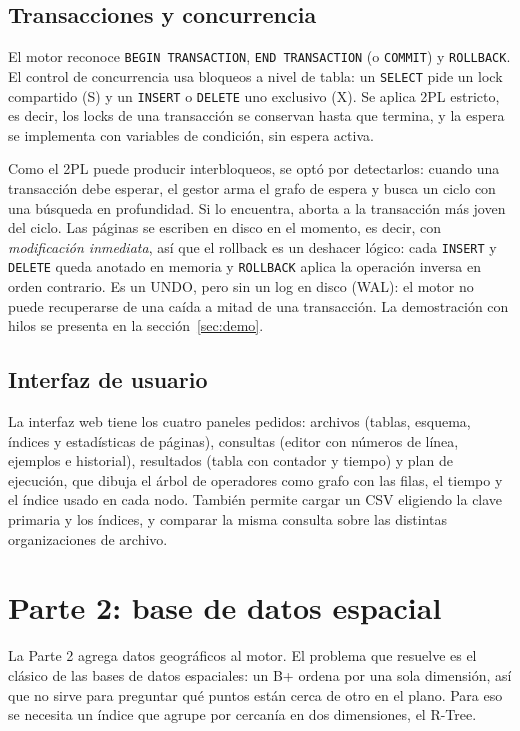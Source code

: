 \documentclass[11pt,a4paper]{article}
\begin{document}
\subsection{Transacciones y concurrencia}

El motor reconoce \texttt{BEGIN TRANSACTION}, \texttt{END TRANSACTION} (o \texttt{COMMIT}) y \texttt{ROLLBACK}. El control de concurrencia usa bloqueos a nivel de tabla: un \texttt{SELECT} pide un lock compartido (S) y un \texttt{INSERT} o \texttt{DELETE} uno exclusivo (X). Se aplica 2PL estricto, es decir, los locks de una transacción se conservan hasta que termina, y la espera se implementa con variables de condición, sin espera activa.

Como el 2PL puede producir interbloqueos, se optó por detectarlos: cuando una transacción debe esperar, el gestor arma el grafo de espera y busca un ciclo con una búsqueda en profundidad. Si lo encuentra, aborta a la transacción más joven del ciclo. Las páginas se escriben en disco en el momento, es decir, con \emph{modificación inmediata}, así que el rollback es un deshacer lógico: cada \texttt{INSERT} y \texttt{DELETE} queda anotado en memoria y \texttt{ROLLBACK} aplica la operación inversa en orden contrario. Es un UNDO, pero sin un log en disco (WAL): el motor no puede recuperarse de una caída a mitad de una transacción. La demostración con hilos se presenta en la sección~\ref{sec:demo}.

\subsection{Interfaz de usuario}

La interfaz web tiene los cuatro paneles pedidos: archivos (tablas, esquema, índices y estadísticas de páginas), consultas (editor con números de línea, ejemplos e historial), resultados (tabla con contador y tiempo) y plan de ejecución, que dibuja el árbol de operadores como grafo con las filas, el tiempo y el índice usado en cada nodo. También permite cargar un CSV eligiendo la clave primaria y los índices, y comparar la misma consulta sobre las distintas organizaciones de archivo.

\section{Parte 2: base de datos espacial}

La Parte 2 agrega datos geográficos al motor. El problema que resuelve es el clásico de las bases de datos espaciales: un B+ ordena por una sola dimensión, así que no sirve para preguntar qué puntos están cerca de otro en el plano. Para eso se necesita un índice que agrupe por cercanía en dos dimensiones, el R-Tree.
\end{document}

